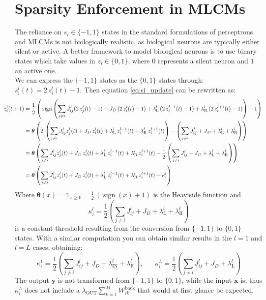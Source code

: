 \documentclass[a4paper,12pt]{report}
\begin{document}
\section{Sparsity Enforcement in MLCMs}
The reliance on $s_i \in \{-1, 1\}$ states in the standard formulations of perceptrons and MLCMs
is not biologically realistic, as biological neurons are typically either silent or 
active. A better framework to model biological neurons is to use binary states which 
take values in $z_i \in \{0, 1\}$, where $0$ represents a silent neuron and $1$ an active one.\\
We can express the $\{-1, 1\}$ states as the $\{0, 1\}$ states through: 
$s_i^l(t) = 2 \, z_i^l(t) - 1$. Then equation \ref{eq:si_update} can be rewritten as:
\begin{align*}
    \hspace{-20pt}z_i^l(t+1) &= \frac{1}{2} \left( \, \operatorname{sign}\left(\displaystyle\sum_{j \neq i} J_{ij}^l 
    (2 \, z_j^l(t) - 1) + J_D\, (2 \, z_i^l(t) - 1) + \lambda_{\mathrm{L}}^l\, (2 \, 
    z_i^{l-1}(t) - 1) + \lambda_{\mathrm{R}}^l\, (2 \, z_i^{l+1}(t) - 1)\right) + 1 \right)\\
    &= \boldsymbol{\theta}\left(2 \, \left( \sum_{j \neq i} J_{ij}^l 
    z_j^l(t) + J_D\, z_i^l(t) + \lambda_{\mathrm{L}}^l \, z_i^{l-1}(t) + \lambda_{\mathrm{R}}^l \, 
    z_i^{l+1}(t) \right) - \left( \sum_{j \neq i} J_{ij}^l + J_D + \lambda_{\mathrm{L}}^l
    + \lambda_{\mathrm{R}}^l \right) \right) \\
    &= \boldsymbol{\theta}\left(\sum_{j \neq i} J_{ij}^l z_j^l(t) + J_D\, z_i^l(t) + 
    \lambda_{\mathrm{L}}^l \, z_i^{l-1}(t) + \lambda_{\mathrm{R}}^l \, z_i^{l+1}(t) - 
    \frac{1}{2} \left(\sum_{j \neq i} J_{ij}^l + J_D + \lambda_{\mathrm{L}}^l + 
    \lambda_{\mathrm{R}}^l\right) \right) \\
    &= \boldsymbol{\theta}\left(\sum_{j \neq i} J_{ij}^l z_j^l(t) + J_D\, z_i^l(t) + 
    \lambda_{\mathrm{L}}^l \, z_i^{l-1}(t) + \lambda_{\mathrm{R}}^l \, z_i^{l+1}(t) - 
    \kappa_i^l\right)
\end{align*}
Where $\boldsymbol{\theta}(x) = \mathds{1}_{x \geq 0} = \frac{1}{2} \, \left( \operatorname{sign}(x)
+ 1\right)$ is the Heaviside function and $$\kappa_i^l = \frac{1}{2} \left(\sum_{j \neq i} 
J_{ij}^l + J_D + \lambda_{\mathrm{L}}^l + \lambda_{\mathrm{R}}^l\right)$$ is a 
constant threshold resulting from the conversion from $\{-1, 1\}$ to $\{0, 1\}$ 
states. With a similar computation you can obtain similar results in the $l=1$ and $l=L$
cases, obtaining:
$$ \kappa_i^1 = \frac{1}{2}\left(\sum_{j \neq i} J_{ij}^l + J_D + 
\lambda_{\mathrm{IN}}^l + \lambda_{\mathrm{R}}^l\right), \hspace{20pt} 
\kappa_i^L = \frac{1}{2}\left(\sum_{j \neq i} J_{ij}^l + J_D + 
\lambda_{\mathrm{L}}^l\right)$$
The output $\mathbf{y}$ is not transformed from $\{-1, 1\}$ to $\{0, 1\}$, while 
the input $\mathbf{x}$ is, thus $\kappa_i^L$ does not include a 
$\lambda_{\mathrm{OUT}}\sum_{k=1}^{M} W_{ik}^{\mathrm{back}}$ that would at first glance
be expected.
\end{document}

